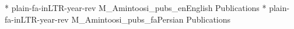\documentclass[10pt,a4paper]{moderncv}
\begin{document}

\nocite{pubEn}{*}
{plain-fa-inLTR-year-rev}
{M_Amintoosi_pubs_en}{English Publications}
\nocite{pubFa}{*}
{plain-fa-inLTR-year-rev}
{M_Amintoosi_pubs_fa}{Persian Publications}

%
%

%
%
%
\end{document}
